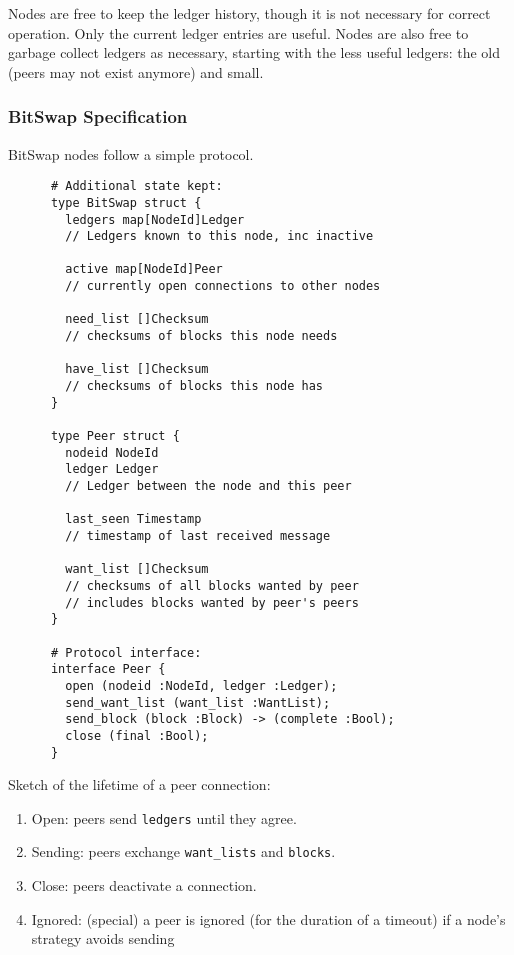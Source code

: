 \documentclass{sig-alternate}
\begin{document}
Nodes are free to keep the ledger history, though it is not necessary for
correct operation. Only the current ledger entries are useful. Nodes are
also free to garbage collect ledgers as necessary, starting with the less
useful ledgers: the old (peers may not exist anymore) and small.

\subsubsection{BitSwap Specification}

BitSwap nodes follow a simple protocol.

\begin{verbatim}
      # Additional state kept:
      type BitSwap struct {
        ledgers map[NodeId]Ledger
        // Ledgers known to this node, inc inactive

        active map[NodeId]Peer
        // currently open connections to other nodes

        need_list []Checksum
        // checksums of blocks this node needs

        have_list []Checksum
        // checksums of blocks this node has
      }

      type Peer struct {
        nodeid NodeId
        ledger Ledger
        // Ledger between the node and this peer

        last_seen Timestamp
        // timestamp of last received message

        want_list []Checksum
        // checksums of all blocks wanted by peer
        // includes blocks wanted by peer's peers
      }

      # Protocol interface:
      interface Peer {
        open (nodeid :NodeId, ledger :Ledger);
        send_want_list (want_list :WantList);
        send_block (block :Block) -> (complete :Bool);
        close (final :Bool);
      }
\end{verbatim}


Sketch of the lifetime of a peer connection:
\begin{enumerate}
  \item Open: peers send \texttt{ledgers} until they agree.
  \item Sending: peers exchange \texttt{want\_lists} and \texttt{blocks}.
  \item Close: peers deactivate a connection.
  \item Ignored: (special) a peer is ignored (for the duration of a timeout)
        if a node's strategy avoids sending

\end{enumerate}
\end{document}
